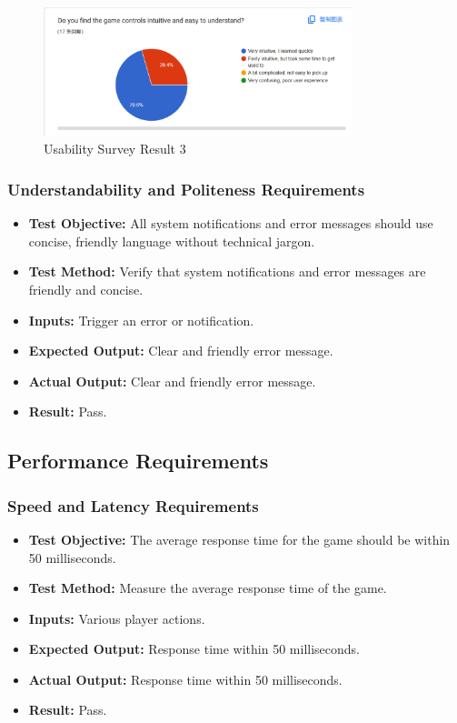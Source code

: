 \documentclass[12pt, titlepage]{article}
\begin{document}
\begin{figure}[h!]
    \centering
    \includegraphics[width=0.8\textwidth]{image2.png}
    \caption{Usability Survey Result 3}
    \label{fig:labelname}
\end{figure}


\subsubsection{Understandability and Politeness Requirements}
\begin{itemize}
    \item \textbf{Test Objective:} All system notifications and error messages should use concise, friendly language without technical jargon.
    \item \textbf{Test Method:} Verify that system notifications and error messages are friendly and concise.
    \item \textbf{Inputs:} Trigger an error or notification.
    \item \textbf{Expected Output:} Clear and friendly error message.
    \item \textbf{Actual Output:} Clear and friendly error message.
    \item \textbf{Result:} Pass.
\end{itemize}

\subsection{Performance Requirements}

\subsubsection{Speed and Latency Requirements}
\begin{itemize}
    \item \textbf{Test Objective:} The average response time for the game should be within 50 milliseconds.
    \item \textbf{Test Method:} Measure the average response time of the game.
    \item \textbf{Inputs:} Various player actions.
    \item \textbf{Expected Output:} Response time within 50 milliseconds.
    \item \textbf{Actual Output:} Response time within 50 milliseconds.
    \item \textbf{Result:} Pass.
\end{itemize}
\end{document}
